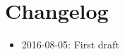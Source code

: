 \documentclass[pdftex,11pt,a4paper]{article} %
\author{\sAuthors}
\title{\sTitle}
\begin{document}
\maketitle
\tableofcontents
\section*{Changelog}
\begin{itemize}
  \item 2016-08-05: First draft
\end{itemize}
\clearpage




%



\appendix



\end{document}
